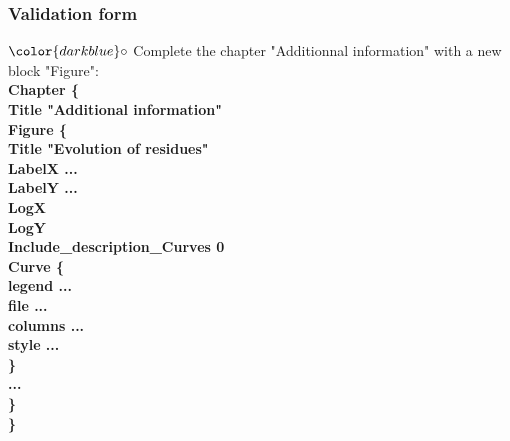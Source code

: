 \documentclass[10pt]{beamer}
\begin{document}
\begin{frame}
\frametitle{Validation form}
\begin{block}{}

\hspace{1cm} $\color{darkblue}\circ$ {\small{ Complete the chapter "Additionnal information" with a new block "Figure":}}\\
{\footnotesize{
\hspace{1.5cm} \textbf{Chapter \{}  \\
\hspace{1.8cm} \textbf{Title "Additional information"}  \\
\hspace{1.8cm} \textbf{Figure \{}  \\
\hspace{2cm} \textbf{Title "Evolution of residues"}  \\
\hspace{2cm} \textbf{LabelX ...}  \\
\hspace{2cm} \textbf{LabelY ...}  \\
\hspace{2cm} \textbf{LogX}  \\
\hspace{2cm} \textbf{LogY}  \\
\hspace{2cm} \textbf{Include\_description\_Curves 0}  \\
\hspace{2cm} \textbf{Curve \{ }  \\
\hspace{2.3cm} \textbf{legend ...}  \\
\hspace{2.3cm} \textbf{file ...}  \\
\hspace{2.3cm} \textbf{columns ...}  \\
\hspace{2.3cm} \textbf{style ...}  \\
\hspace{2cm} \textbf{\}}  \\
\hspace{2cm} \textbf{...}  \\
\hspace{1.8cm} \textbf{\}}  \\
\hspace{1.5cm} \textbf{\}}  \\
}}

\end{block}
\end{frame}
\end{document}
